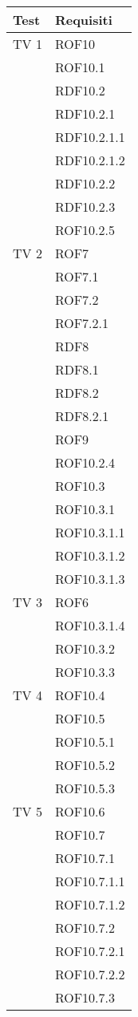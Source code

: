 \begin{center}
\begin{longtable}{|p{7cm}|p{7cm}|}
\toprule
\textbf{Test} & \textbf{Requisiti}\\
\midrule
TV 1 & ROF10\\ & ROF10.1\\ & RDF10.2\\ & RDF10.2.1\\ &  RDF10.2.1.1\\ &  RDF10.2.1.2\\ &  RDF10.2.2 \\ & RDF10.2.3\\ &   ROF10.2.5\\
\midrule
TV 2 & ROF7\\ &  ROF7.1\\ &  ROF7.2\\ &  ROF7.2.1\\ &  RDF8\\ &  RDF8.1\\ &  RDF8.2\\ &  RDF8.2.1\\ &  ROF9\\ &  ROF10.2.4\\ &  ROF10.3\\ &  ROF10.3.1\\ &  ROF10.3.1.1\\ &  ROF10.3.1.2\\ &  ROF10.3.1.3\\
\midrule
TV 3 & ROF6\\ &  ROF10.3.1.4\\ &  ROF10.3.2\\ &  ROF10.3.3\\
\midrule
TV 4 &  ROF10.4\\ &  ROF10.5\\ &  ROF10.5.1\\ &  ROF10.5.2\\ &  ROF10.5.3\\
\midrule
TV 5 &  ROF10.6\\ &  ROF10.7\\ &  ROF10.7.1\\ &  ROF10.7.1.1\\ &  ROF10.7.1.2\\ &  ROF10.7.2\\ &  ROF10.7.2.1\\ &  ROF10.7.2.2\\ &  ROF10.7.3\\
\midrule

\end{longtable}
\end{center}
